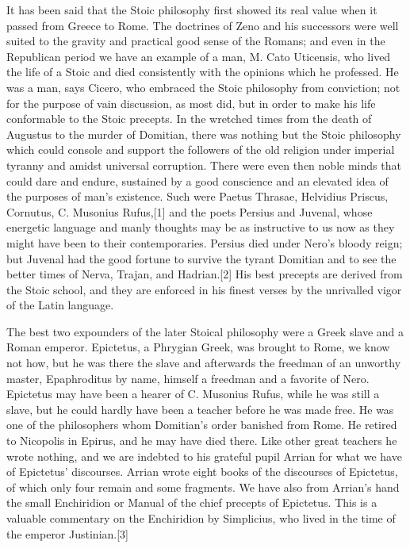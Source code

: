 It has been said that the Stoic philosophy first showed its real value when it passed from Greece to Rome. The doctrines of Zeno and his successors were well suited to the gravity and practical good sense of the Romans; and even in the Republican period we have an example of a man, M. Cato Uticensis, who lived the life of a Stoic and died consistently with the opinions which he professed. He was a man, says Cicero, who embraced the Stoic philosophy from conviction; not for the purpose of vain discussion, as most did, but in order to make his life conformable to the Stoic precepts. In the wretched times from the death of Augustus to the murder of Domitian, there was nothing but the Stoic philosophy which could console and support the followers of the old religion under imperial tyranny and amidst universal corruption. There were even then noble minds that could dare and endure, sustained by a good conscience and an elevated idea of the purposes of man's existence. Such were Paetus Thrasae, Helvidius Priscus, Cornutus, C. Musonius Rufus,[1] and the poets Persius and Juvenal, whose energetic language and manly thoughts may be as instructive to us now as they might have been to their contemporaries. Persius died under Nero's bloody reign; but Juvenal had the good fortune to survive the tyrant Domitian and to see the better times of Nerva, Trajan, and Hadrian.[2] His best precepts are derived from the Stoic school, and they are enforced in his finest verses by the unrivalled vigor of the Latin language.

The best two expounders of the later Stoical philosophy were a Greek slave and a Roman emperor. Epictetus, a Phrygian Greek, was brought to Rome, we know not how, but he was there the slave and afterwards the freedman of an unworthy master, Epaphroditus by name, himself a freedman and a favorite of Nero. Epictetus may have been a hearer of C. Musonius Rufus, while he was still a slave, but he could hardly have been a teacher before he was made free. He was one of the philosophers whom Domitian's order banished from Rome. He retired to Nicopolis in Epirus, and he may have died there. Like other great teachers he wrote nothing, and we are indebted to his grateful pupil Arrian for what we have of Epictetus' discourses. Arrian wrote eight books of the discourses of Epictetus, of which only four remain and some fragments. We have also from Arrian's hand the small Enchiridion or Manual of the chief precepts of Epictetus. This is a valuable commentary on the Enchiridion by Simplicius, who lived in the time of the emperor Justinian.[3]

